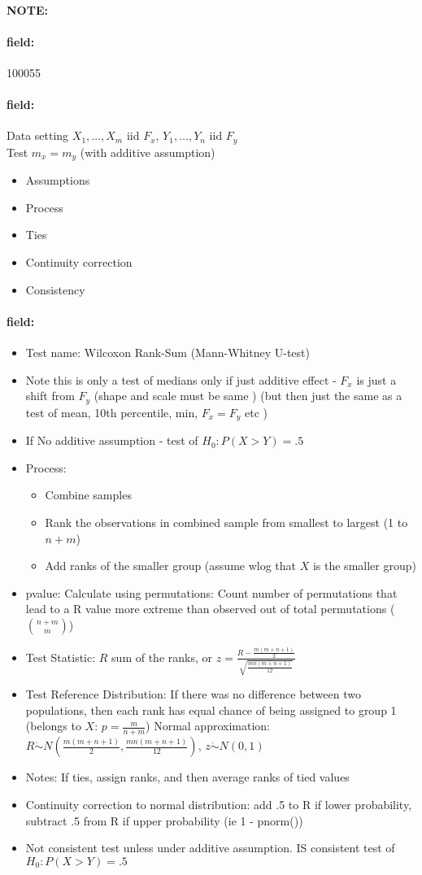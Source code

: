 \documentclass[12pt]{article}
\newenvironment{note}{\paragraph{NOTE:}}{}
\newenvironment{field}{\paragraph{field:}}{}
\begin{document}
\begin{note} \begin{field} \tiny 100055 \end{field}
 \begin{field}
  Data setting $X_1, \ldots , X_m$ iid $F_x$, $Y_1, \ldots, Y_n$ iid $F_y$\\
  Test $m_x = m_y$ (with additive assumption)
  \begin{itemize}
   \item Assumptions
   \item Process
   \item Ties
   \item Continuity correction
   \item Consistency
  \end{itemize}
 \end{field}
 \begin{field}
  \begin{itemize}
   \item Test name: Wilcoxon Rank-Sum (Mann-Whitney U-test)
   \item Note this is only a test of medians only if just additive effect - $F_x$ is just a shift from $F_y$ (shape and scale must be same ) (but then just the same as a test of mean, 10th percentile, min, $F_x = F_y$ etc )
   \item If No additive assumption - test of $H_0: P(X > Y) = .5$
   \item Process:
         \begin{itemize}
          \item Combine samples
          \item Rank the observations in combined sample from smallest to largest (1 to $n + m$)
          \item Add ranks of the smaller group (assume wlog that $X$ is the smaller group)
         \end{itemize}
   \item pvalue: Calculate using permutations: Count number of permutations that lead to a R value more extreme than observed out of total permutations ($\binom{n+m}{m}$)
   \item Test Statistic: $R$ sum of the ranks, or $z = \frac{R - \frac{m(m+n+1)}{2}}{\sqrt{\frac{mn(m+n+1)}{12}}}$
   \item Test Reference Distribution: If there was no difference between two populations, then each rank has equal chance of being assigned to group 1 (belongs to $X$: $p = \frac{m}{n+m}$)
         Normal approximation: $R \dot\sim N( \frac{m(m+n+1)}{2}, \frac{mn(m+n+1)}{12})$, $z \dot\sim N(0,1)$
   \item Notes: If ties, assign ranks, and then average ranks of tied values
   \item Continuity correction to normal distribution: add .5 to R if lower probability, subtract .5 from R if upper probability (ie 1 - pnorm())
   \item Not consistent test unless under additive assumption. IS consistent test of $H_0: P(X > Y) = .5$
  \end{itemize}
 \end{field}
\end{note}
\end{document}
